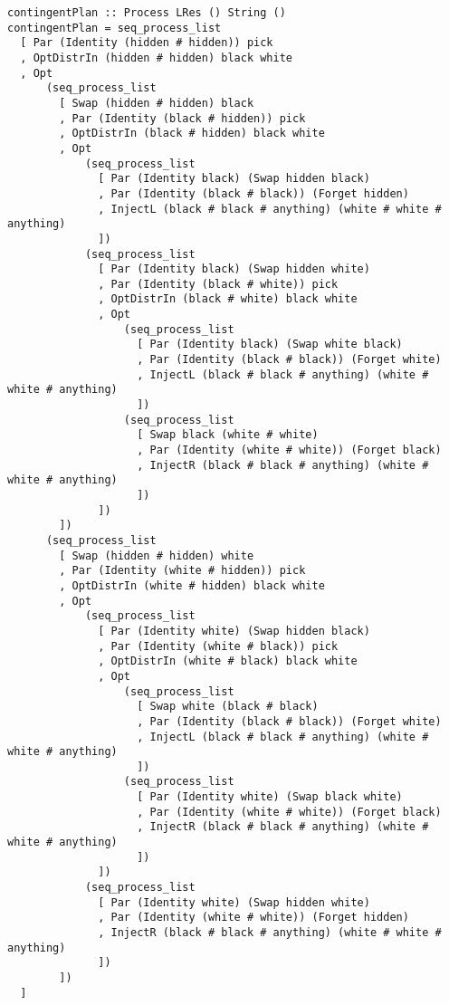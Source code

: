 \documentclass[class=smolathesis,crop=false]{standalone}
\begin{document}
\begin{lstlisting}[label=lst:contingent,caption=Contingent plan for picking three matching socks,basicstyle=\footnotesize\ttfamily,columns=flexible,breaklines=true]
contingentPlan :: Process LRes () String ()
contingentPlan = seq_process_list
  [ Par (Identity (hidden # hidden)) pick
  , OptDistrIn (hidden # hidden) black white
  , Opt
      (seq_process_list
        [ Swap (hidden # hidden) black
        , Par (Identity (black # hidden)) pick
        , OptDistrIn (black # hidden) black white
        , Opt
            (seq_process_list
              [ Par (Identity black) (Swap hidden black)
              , Par (Identity (black # black)) (Forget hidden)
              , InjectL (black # black # anything) (white # white # anything)
              ])
            (seq_process_list
              [ Par (Identity black) (Swap hidden white)
              , Par (Identity (black # white)) pick
              , OptDistrIn (black # white) black white
              , Opt
                  (seq_process_list
                    [ Par (Identity black) (Swap white black)
                    , Par (Identity (black # black)) (Forget white)
                    , InjectL (black # black # anything) (white # white # anything)
                    ])
                  (seq_process_list
                    [ Swap black (white # white)
                    , Par (Identity (white # white)) (Forget black)
                    , InjectR (black # black # anything) (white # white # anything)
                    ])
              ])
        ])
      (seq_process_list
        [ Swap (hidden # hidden) white
        , Par (Identity (white # hidden)) pick
        , OptDistrIn (white # hidden) black white
        , Opt
            (seq_process_list
              [ Par (Identity white) (Swap hidden black)
              , Par (Identity (white # black)) pick
              , OptDistrIn (white # black) black white
              , Opt
                  (seq_process_list
                    [ Swap white (black # black)
                    , Par (Identity (black # black)) (Forget white)
                    , InjectL (black # black # anything) (white # white # anything)
                    ])
                  (seq_process_list
                    [ Par (Identity white) (Swap black white)
                    , Par (Identity (white # white)) (Forget black)
                    , InjectR (black # black # anything) (white # white # anything)
                    ])
              ])
            (seq_process_list
              [ Par (Identity white) (Swap hidden white)
              , Par (Identity (white # white)) (Forget hidden)
              , InjectR (black # black # anything) (white # white # anything)
              ])
        ])
  ]
\end{lstlisting}
\cbend

\ifstandalone


\fi
\end{document}
